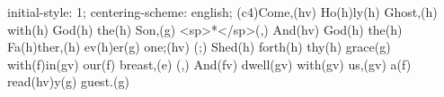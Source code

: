 initial-style: 1;
centering-scheme: english;
(c4)Come,(hv) Ho(h)ly(h) Ghost,(h) with(h) God(h) the(h) Son,(g) <sp>*</sp>(,)
And(hv) God(h) the(h) Fa(h)ther,(h) ev(h)er(g) one;(hv) (;)
Shed(h) forth(h) thy(h) grace(g) with(f)in(gv) our(f) breast,(e) (,)
And(fv) dwell(gv) with(gv) us,(gv) a(f) read(hv)y(g) guest.(g)
